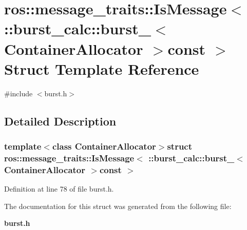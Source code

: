\section{ros\-:\-:message\-\_\-traits\-:\-:\-Is\-Message$<$ \-:\-:burst\-\_\-calc\-:\-:burst\-\_\-$<$ \-Container\-Allocator $>$const $>$ \-Struct \-Template \-Reference}
\label{structros_1_1message__traits_1_1IsMessage_3_01_1_1burst__calc_1_1burst___3_01ContainerAllocator_01_4const_01_01_4}


{\ttfamily \#include $<$burst.\-h$>$}



\subsection{\-Detailed \-Description}
\subsubsection*{template$<$class Container\-Allocator$>$struct ros\-::message\-\_\-traits\-::\-Is\-Message$<$ \-::burst\-\_\-calc\-::burst\-\_\-$<$ Container\-Allocator $>$const  $>$}



\-Definition at line 78 of file burst.\-h.



\-The documentation for this struct was generated from the following file\-:\begin{DoxyCompactItemize}
\item 
{\bf burst.\-h}\end{DoxyCompactItemize}
